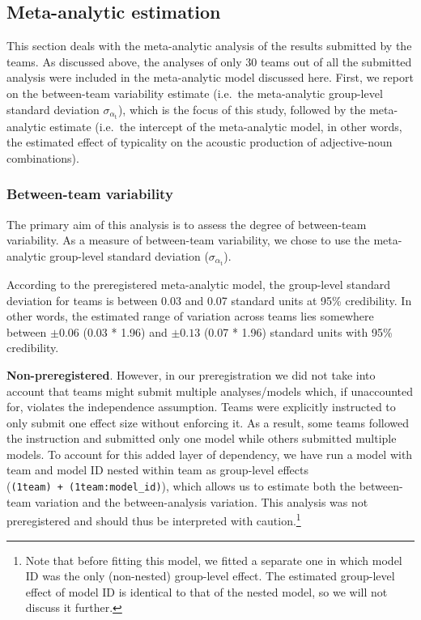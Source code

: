 \documentclass[Review,times,sageh]{sagej}
\begin{document}
\hypertarget{meta-est-2}{%
\subsection{Meta-analytic estimation}\label{meta-est-2}}

This section deals with the meta-analytic analysis of the results submitted by the teams.
As discussed above, the analyses of only 30 teams out of all the submitted analysis were included in the meta-analytic model discussed here.
First, we report on the between-team variability estimate (i.e.~the meta-analytic group-level standard deviation \(\sigma_{\alpha_{\text{t}}}\)), which is the focus of this study, followed by the meta-analytic estimate (i.e.~the intercept of the meta-analytic model, in other words, the estimated effect of typicality on the acoustic production of adjective-noun combinations).

\hypertarget{between-team-variability}{%
\subsubsection{Between-team variability}\label{between-team-variability}}

The primary aim of this analysis is to assess the degree of between-team variability.
As a measure of between-team variability, we chose to use the meta-analytic group-level standard deviation (\(\sigma_{\alpha_{\text{t}}}\)).

According to the preregistered meta-analytic model, the group-level standard deviation for teams is between 0.03 and 0.07 standard units at 95\% credibility.
In other words, the estimated range of variation across teams lies somewhere between \(\pm 0.06\) (0.03 * 1.96) and \(\pm 0.13\) (0.07 * 1.96) standard units with 95\% credibility.

\textbf{Non-preregistered}. However, in our preregistration we did not take into account that teams might submit multiple analyses/models which, if unaccounted for, violates the independence assumption.
Teams were explicitly instructed to only submit one effect size without enforcing it.
As a result, some teams followed the instruction and submitted only one model while others submitted multiple models.
To account for this added layer of dependency, we have run a model with team and model ID nested within team as group-level effects (\texttt{(1\textbar{}team)\ +\ (1\textbar{}team:model\_id)}), which allows us to estimate both the between-team variation and the between-analysis variation.
This analysis was not preregistered and should thus be interpreted with caution.\footnote{Note that before fitting this model, we fitted a separate one in which model ID was the only (non-nested) group-level effect.
  The estimated group-level effect of model ID is identical to that of the nested model, so we will not discuss it further.}
\end{document}
